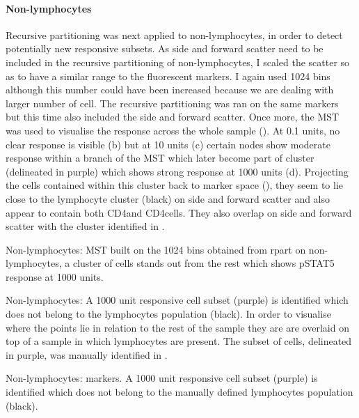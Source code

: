 \paragraph{Non-lymphocytes}

Recursive partitioning was next applied to non-lymphocytes, in order to detect potentially new responsive subsets.
As side and forward scatter need to be included in the recursive partitioning of non-lymphocytes,
I scaled the scatter so as to have a similar range to the fluorescent markers.
I again used 1024 bins although this number could have been increased because we are dealing with larger number of cell.
The recursive partitioning was ran on the same markers but this time also included the side and forward scatter.
Once more, the MST was used to visualise the response across the whole sample ().
At 0.1 units, no clear response is visible (b) but at 10 units
(c) certain nodes show moderate response within a branch of the MST which
later become part of cluster (delineated in purple) which shows strong response at 1000 units (d).
Projecting the cells contained within this cluster back to marker space (), 
they seem to lie close to the lymphocyte cluster (black) on side and forward scatter and also appear to contain both CD4\negative and CD4\positive cells.
They also overlap on side and forward scatter with the cluster identified in .


{ Non-lymphocytes: MST built on the 1024 bins obtained from rpart on non-lymphocytes, a cluster of cells stands out from the rest which shows pSTAT5 response at 1000 units.}
{
}

{ Non-lymphocytes:  A 1000 unit responsive cell subset (purple) is identified which does not belong to the lymphocytes population (black).  }
{
  In order to visualise where the points lie in relation to the rest of the sample they are are overlaid on top of a sample in which lymphocytes are present.
  The subset of cells, delineated in purple, was manually identified in .
}

{ Non-lymphocytes: markers. }
{
  A 1000 unit responsive cell subset (purple) is identified which does not belong to the manually defined lymphocytes population (black). 
}

